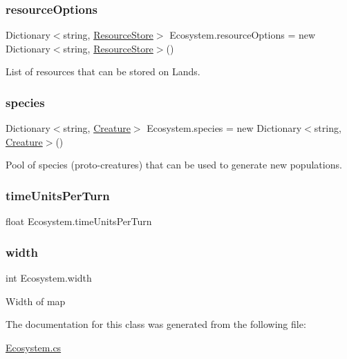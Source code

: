 \subsubsection{\texorpdfstring{resource\+Options}{resourceOptions}}
{\footnotesize\ttfamily Dictionary$<$string, \mbox{\hyperlink{class_resource_store}{Resource\+Store}}$>$ Ecosystem.\+resource\+Options = new Dictionary$<$string, \mbox{\hyperlink{class_resource_store}{Resource\+Store}}$>$()}



List of resources that can be stored on Lands. 

\mbox{\label{class_ecosystem_a3cd0f83955fce1623326b58666a6a9af}} 
\subsubsection{\texorpdfstring{species}{species}}
{\footnotesize\ttfamily Dictionary$<$string, \mbox{\hyperlink{class_creature}{Creature}}$>$ Ecosystem.\+species = new Dictionary$<$string, \mbox{\hyperlink{class_creature}{Creature}}$>$()}



Pool of species (proto-\/creatures) that can be used to generate new populations. 

\mbox{\label{class_ecosystem_a4eb1b47f3b158dc533ad6c2983b2f481}} 
\subsubsection{\texorpdfstring{time\+Units\+Per\+Turn}{timeUnitsPerTurn}}
{\footnotesize\ttfamily float Ecosystem.\+time\+Units\+Per\+Turn}

\mbox{\label{class_ecosystem_acd13711fb3bdc5aafb4d70ccd069d385}} 
\subsubsection{\texorpdfstring{width}{width}}
{\footnotesize\ttfamily int Ecosystem.\+width}



Width of map 



The documentation for this class was generated from the following file\+:\begin{DoxyCompactItemize}
\item 
\mbox{\hyperlink{_ecosystem_8cs}{Ecosystem.\+cs}}\end{DoxyCompactItemize}
